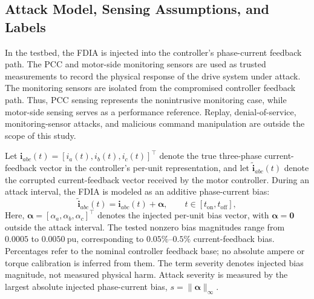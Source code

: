 \documentclass[letterpaper,journal]{IEEEtran}
\begin{document}
\subsection{Attack Model, Sensing Assumptions, and Labels}
\label{sec:attack_labels}

In the testbed, the FDIA is injected into the controller's phase-current feedback path. The PCC and motor-side monitoring sensors are used as trusted measurements to record the physical response of the drive system under attack. 
The monitoring sensors are isolated from the compromised controller feedback path. Thus, PCC sensing represents the nonintrusive monitoring case, while motor-side sensing serves as a performance reference. Replay, denial-of-service, monitoring-sensor attacks, and malicious command manipulation are outside the scope of this study.

Let $\mathbf{i}_{abc}(t)=[i_a(t),i_b(t),i_c(t)]^\top$ denote the true three-phase current-feedback vector in the controller's per-unit representation, and let $\tilde{\mathbf{i}}_{abc}(t)$ denote the corrupted current-feedback vector received by the motor controller. During an attack interval, the FDIA is modeled as an additive phase-current bias:
\begin{equation}
\tilde{\mathbf{i}}_{abc}(t)
=
\mathbf{i}_{abc}(t)+\boldsymbol{\alpha},
\qquad t\in[t_{\mathrm{on}},t_{\mathrm{off}}],
\label{eq:fdia_model}
\end{equation}
Here, \(\boldsymbol{\alpha}=[\alpha_a,\alpha_b,\alpha_c]^\top\) denotes the injected per-unit bias vector, with \(\boldsymbol{\alpha}=\mathbf{0}\) outside the attack interval. The tested nonzero bias magnitudes range from \(0.0005\) to \(0.0050~\mathrm{pu}\), corresponding to \(0.05\%\)--\(0.5\%\) current-feedback bias. Percentages refer to the nominal controller feedback base; no absolute ampere or torque calibration is inferred from them. The term severity denotes injected bias magnitude, not measured physical harm. Attack severity is measured by the largest absolute injected phase-current bias, 
\(s=\|\boldsymbol{\alpha}\|_\infty\).
\end{document}
